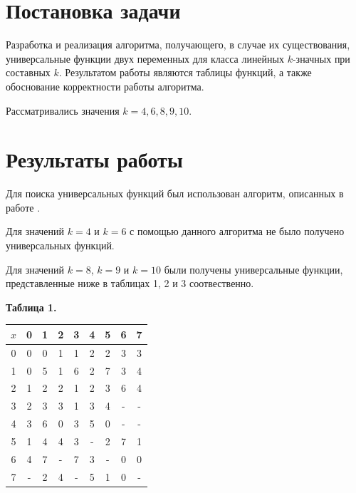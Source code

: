\documentclass[oneside,final,14pt]{extreport}
\begin{document}



  \chapter*{Постановка задачи}
  
Разработка и реализация алгоритма, получающего, в случае их существования, универсальные функции 
двух переменных для класса линейных \(k\)-значных при составных \(k\). Результатом работы являются таблицы 
функций, а также обоснование корректности работы алгоритма.
  
Рассматривались значения \(k = 4, 6, 8, 9, 10\).


\chapter*{Результаты работы}

Для поиска универсальных функций был использован алгоритм, описанных в работе \cite{}.

Для значений \(k = 4\) и \(k = 6\) с помощью данного алгоритма не было получено универсальных функций.

Для значений \(k = 8\), \(k = 9\) и \(k = 10\) были получены универсальные функции, представленные ниже 
в таблицах 1, 2 и 3 соотвественно.

\centerline{\bf Таблица 1.}
\begin{center}
\begin{tabular}{|c|c|c|c|c|c|c|c|c|}
\hline \(x\) & 0 & 1 & 2 & 3 & 4 & 5 & 6 & 7 \\ \hline
0 & 0 & 0 & 1 & 1 & 2 & 2 & 3 & 3 \\ \hline 
1 & 0 & 5 & 1 & 6 & 2 & 7 & 3 & 4 \\ \hline
2 & 1 & 2 & 2 & 1 & 2 & 3 & 6 & 4 \\ \hline
3 & 2 & 3 & 3 & 1 & 3 & 4 & - & - \\ \hline
4 & 3 & 6 & 0 & 3 & 5 & 0 & - & - \\ \hline
5 & 1 & 4 & 4 & 3 & - & 2 & 7 & 1 \\ \hline
6 & 4 & 7 & - & 7 & 3 & - & 0 & 0 \\ \hline
7 & - & 2 & 4 & - & 5 & 1 & 0 & - \\ \hline
\end{tabular}
\end{center}
\end{document}
